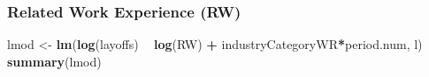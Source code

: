 \documentclass[
]{article}
\newenvironment{Shaded}{\begin{snugshade}}{\end{snugshade}}
\newcommand{\KeywordTok}[1]{\textcolor[rgb]{0.13,0.29,0.53}{\textbf{#1}}}
\newcommand{\NormalTok}[1]{#1}
\newcommand{\OperatorTok}[1]{\textcolor[rgb]{0.81,0.36,0.00}{\textbf{#1}}}
\newcommand{\StringTok}[1]{\textcolor[rgb]{0.31,0.60,0.02}{#1}}
\begin{document}
\hypertarget{related-work-experience-rw-1}{%
\subsubsection{Related Work Experience
(RW)}\label{related-work-experience-rw-1}}

\begin{Shaded}
\begin{Highlighting}[]
\NormalTok{lmod <-}\StringTok{ }\KeywordTok{lm}\NormalTok{(}\KeywordTok{log}\NormalTok{(layoffs) }\OperatorTok{~}\StringTok{ }\KeywordTok{log}\NormalTok{(RW) }\OperatorTok{+}\StringTok{ }\NormalTok{industryCategoryWR}\OperatorTok{*}\NormalTok{period.num, l)}
\KeywordTok{summary}\NormalTok{(lmod)}
\end{Highlighting}
\end{Shaded}
\end{document}
